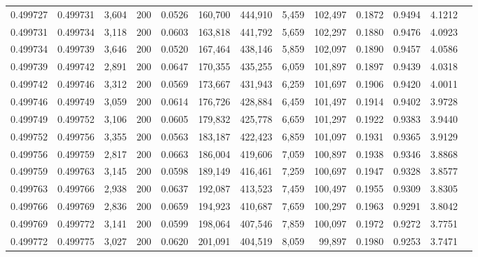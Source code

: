 \begin{tabular}{rrrrrrrrrrrrr}
0.499727 & 0.499731 &  3,604 & 200 &                                     0.0526 & 160,700 & 444,910 &   5,459 & 102,497 & 0.1872 & 0.9494 & 4.1212 \\
0.499731 & 0.499734 &  3,118 & 200 &                                     0.0603 & 163,818 & 441,792 &   5,659 & 102,297 & 0.1880 & 0.9476 & 4.0923 \\
0.499734 & 0.499739 &  3,646 & 200 &                                     0.0520 & 167,464 & 438,146 &   5,859 & 102,097 & 0.1890 & 0.9457 & 4.0586 \\
0.499739 & 0.499742 &  2,891 & 200 &                                     0.0647 & 170,355 & 435,255 &   6,059 & 101,897 & 0.1897 & 0.9439 & 4.0318 \\
0.499742 & 0.499746 &  3,312 & 200 &                                     0.0569 & 173,667 & 431,943 &   6,259 & 101,697 & 0.1906 & 0.9420 & 4.0011 \\
0.499746 & 0.499749 &  3,059 & 200 &                                     0.0614 & 176,726 & 428,884 &   6,459 & 101,497 & 0.1914 & 0.9402 & 3.9728 \\
0.499749 & 0.499752 &  3,106 & 200 &                                     0.0605 & 179,832 & 425,778 &   6,659 & 101,297 & 0.1922 & 0.9383 & 3.9440 \\
0.499752 & 0.499756 &  3,355 & 200 &                                     0.0563 & 183,187 & 422,423 &   6,859 & 101,097 & 0.1931 & 0.9365 & 3.9129 \\
0.499756 & 0.499759 &  2,817 & 200 &                                     0.0663 & 186,004 & 419,606 &   7,059 & 100,897 & 0.1938 & 0.9346 & 3.8868 \\
0.499759 & 0.499763 &  3,145 & 200 &                                     0.0598 & 189,149 & 416,461 &   7,259 & 100,697 & 0.1947 & 0.9328 & 3.8577 \\
0.499763 & 0.499766 &  2,938 & 200 &                                     0.0637 & 192,087 & 413,523 &   7,459 & 100,497 & 0.1955 & 0.9309 & 3.8305 \\
0.499766 & 0.499769 &  2,836 & 200 &                                     0.0659 & 194,923 & 410,687 &   7,659 & 100,297 & 0.1963 & 0.9291 & 3.8042 \\
0.499769 & 0.499772 &  3,141 & 200 &                                     0.0599 & 198,064 & 407,546 &   7,859 & 100,097 & 0.1972 & 0.9272 & 3.7751 \\
0.499772 & 0.499775 &  3,027 & 200 &                                     0.0620 & 201,091 & 404,519 &   8,059 &  99,897 & 0.1980 & 0.9253 & 3.7471 \\

\end{tabular}
